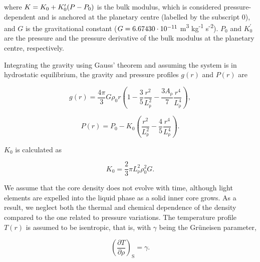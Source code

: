 \documentclass[draft]{agujournal2019} %
\begin{document}
where $K=K_{\mathrm{0}}+K_{\mathrm{0}}^{\prime}(P-P_{\rm 0})$ is  the bulk modulus, which is considered pressure-dependent and is anchored at the planetary centre (labelled by the subscript $0$), and $G$ is the gravitational constant ($G=6.67430\cdot 10^{\rm -11}$ m\textsuperscript{3} kg\textsuperscript{-1} s\textsuperscript{-2}). $P_{\mathrm{0}}$ and $K_{\mathrm{0}}^{\prime}$  are the pressure and the pressure derivative of the bulk modulus at the planetary centre, respectively.

Integrating the gravity using Gauss' theorem and assuming the system is in hydrostatic equilibrium, the gravity and pressure profiles $g(r)$ and $P(r)$ are
\begin{linenomath*}
\begin{equation}\label{eq:gravity}
    g(r) = \frac{4\pi}{3}G\rho_{\mathrm{0}} r \left ( 1-\frac{3}{5}\frac{r^2}{L_{\mathrm{\rho}} ^2} - \frac{3A_{\mathrm{\rho}}}{7} \frac{r^4}{L_{\mathrm{\rho}}^4}\right ),
\end{equation}
\end{linenomath*}
\begin{linenomath*}
\begin{equation}\label{eq:pressure}
    P(r) = P_{\mathrm{0}} - K_{\mathrm{0}}\left ( \frac{r^2}{L_{\mathrm{\rho}} ^2} - \frac{4}{5} \frac{r^4}{L_{\mathrm{\rho}}^4}\right ).
\end{equation}
\end{linenomath*}
 $K_{\mathrm{0}}$ is calculated as 
\begin{linenomath*}
\begin{equation}
    K_{\mathrm{0}} = \frac{2}{3}\pi L_{\mathrm{\rho}}^2\rho_{\mathrm{0}}^2 G. 
\end{equation}
\end{linenomath*}

We assume that the core density does not evolve with time, although light elements are expelled into the liquid phase as a solid inner core grows. As a result, we neglect both the thermal and chemical dependence of the density compared to the one related to pressure variations. The temperature profile $T(r)$ is assumed to be isentropic, that is, with $\gamma$ being the Gr\"uneisen parameter,
\begin{linenomath*}
\begin{equation}
    \left ( \frac{\partial T}{\partial \rho}\right ) _{\mathrm{S}} = \gamma.
\end{equation}
\end{linenomath*}
\end{document}
